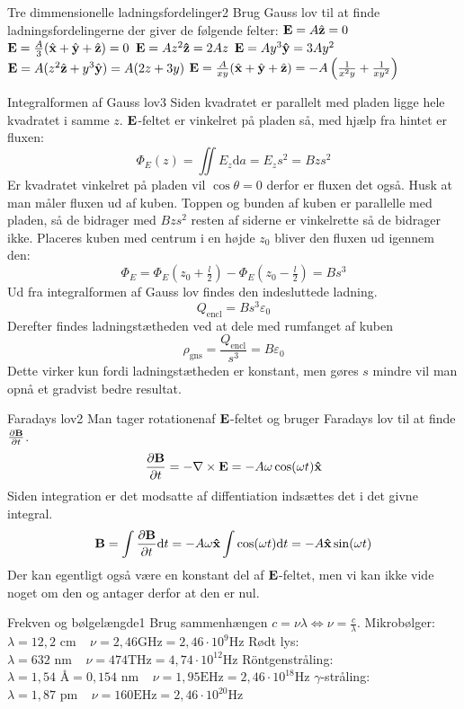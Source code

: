 \begin{opgave}{Tre dimmensionelle ladningsfordelinger}{2}
Brug Gauss lov til at finde ladningsfordelingerne der giver de følgende felter:
\opg $\mathbf{E} =A\hat{\mathbf{z}} = 0$
\opg $\mathbf{E} =\frac{A}{3}(\hat{\mathbf{x}}+\hat{\mathbf{y}}+\hat{\mathbf{z}}) = 0$
\opg $\mathbf{E} =Az^2\mathbf{\hat{z}} = 2Az$
\opg $\mathbf{E} =Ay^3\mathbf{\hat{y}} = 3Ay^2$
\opg $\mathbf{E} =A(z^2\hat{\mathbf{z}}+y^3\hat{\mathbf{y}}) = A(2z+3y)$
\opg $\mathbf{E} =\frac{A}{xy}(\hat{\mathbf{x}}+\hat{\mathbf{y}}+\hat{\mathbf{z}}) = -A\left(\frac{1}{x^2y}+\frac{1}{xy^2}\right)$
\end{opgave}

\begin{opgave}{Integralformen af Gauss lov}{3}
\opg
Siden kvadratet er parallelt med pladen ligge hele kvadratet i samme $z$. $\mathbf{E}$-feltet er vinkelret på pladen så, med hjælp fra hintet er fluxen:
$$
\Phi_E(z) = \iint E_z \mathrm{d}a = E_zs^2 = Bzs^2
$$
\opg
Er kvadratet vinkelret på pladen vil $\cos\theta=0$ derfor er fluxen det også.
\opg
Husk at man måler fluxen ud af kuben. Toppen og bunden af kuben er parallelle med pladen, så de bidrager med $Bzs^2$ resten af siderne er vinkelrette så de bidrager ikke.
Placeres kuben med centrum i en højde $z_0$ bliver den fluxen ud igennem den:
$$
\Phi_E = \Phi_E(z_0+\tfrac{l}{2})-\Phi_E(z_0-\tfrac{l}{2})=Bs^3
$$
Ud fra integralformen af Gauss lov findes den indesluttede ladning.
$$
Q_\text{encl} = Bs^3\varepsilon_0
$$
Derefter findes ladningstætheden ved at dele med rumfanget af kuben
$$
\rho_\text{gns} = \frac{Q_\text{encl}}{s^3} = B\varepsilon_0
$$
Dette virker kun fordi ladningstætheden er konstant, men gøres $s$ mindre vil man opnå et gradvist bedre resultat.
\end{opgave}

\begin{opgave}{Faradays lov}{2}
\opg Man tager rotationenaf $\mathbf{E}$-feltet og bruger Faradays lov til at finde $\frac{\partial \mathbf{B}}{\partial t}$.
$$
\frac{\partial \mathbf{B}}{\partial t} = -\mathbf{\nabla} \times \mathbf{E} = -A\omega\cos(\omega t)\mathbf{\hat{x}}
$$
\opg
Siden integration er det modsatte af diffentiation indsættes det i det givne integral.
$$
\mathbf{B} = \int \frac{\partial \mathbf{B}}{\partial t}\mathrm{d}t = -A\omega\mathbf{\hat{x}}\int\cos(\omega t)\mathrm{d}t = -A\mathbf{\hat{x}}\sin(\omega t)
$$
Der kan egentligt også være en konstant del af $\mathbf{E}$-feltet, men vi kan ikke vide noget om den og antager derfor at den er nul.
\end{opgave}

\begin{opgave}{Frekven og bølgelængde}{1}
Brug sammenhængen $c = \nu\lambda\iff\nu=\frac{c}{\lambda}$.
\opg Mikrobølger: $\lambda = 12,2\text{ cm}~~~~~\nu = 2,46 \mathrm{GHz} = 2,46\cdot 10^9\mathrm{Hz}$
\opg Rødt lys: $\lambda = 632\text{ nm}~~~~~\nu = 474 \mathrm{THz} = 4,74\cdot 10^{12}\mathrm{Hz}$
\opg Röntgenstråling: $\lambda = 1,54\text{ Å}=0,154\text{ nm}~~~~~\nu = 1,95 \mathrm{EHz} = 2,46\cdot 10^{18}\mathrm{Hz}$
\opg $\gamma$-stråling: $\lambda = 1,87\text{ pm}~~~~~\nu = 160 \mathrm{EHz} = 2,46\cdot 10^{20}\mathrm{Hz}$
\end{opgave}

